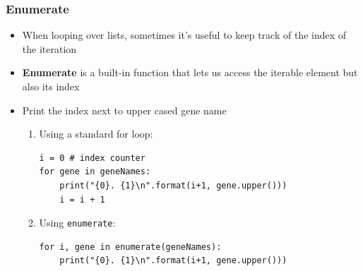 \documentclass[pdf]{beamer}
\begin{document}
\begin{frame}[fragile]
\frametitle{Enumerate}

\begin{itemize}\addtolength{\itemsep}{0.5\baselineskip}
\item<1-> When looping over lists, sometimes it's useful to keep track of the
index of the iteration

\item<2-> \textbf{Enumerate} is a built-in function that lets us access the
iterable element but also its index

\item<3-> Print the index next to upper cased gene name

\begin{enumerate}\addtolength{\itemsep}{-1\baselineskip}

\item<3-> Using a standard for loop:
\begin{lstlisting}[style=python]
i = 0 # index counter
for gene in geneNames:
    print("{0}. {1}\n".format(i+1, gene.upper()))
    i = i + 1
\end{lstlisting}

\item<4-> Using \texttt{enumerate}:
\begin{lstlisting}[style=python]
for i, gene in enumerate(geneNames):
    print("{0}. {1}\n".format(i+1, gene.upper()))
\end{lstlisting}

\end{enumerate}
\end{itemize}

\end{frame}

\end{document}
